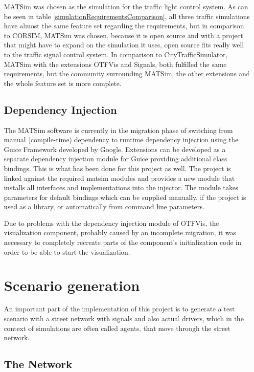 MATSim was chosen as the simulation for the traffic light control system. As can be seen in table \ref{simulationRequirementsComparison}, all three traffic simulations have almost the same feature set regarding the requirements, but in comparison to CORSIM, MATSim was chosen, because it is open source and with a project that might have to expand on the simulation it uses, open source fits really well to the traffic signal control system. In comparison to CityTrafficSimulator, MATSim with the extensions OTFVis and Signals, both fulfilled the same requirements, but the community surrounding MATSim, the other extensions and the whole feature set is more complete.

\subsection*{Dependency Injection}

The MATSim software is currently in the migration phase of switching from manual (compile-time) dependency to runtime dependency injection using the Guice Framework developed by Google. Extensions can be developed as a separate dependency injection module for Guice providing additional class bindings. This is what has been done for this project as well. The project is linked against the required matsim modules and provides a new module that installs all interfaces and implementations into the injector. The module takes parameters for default bindings which can be supplied manually, if the project is used as a library, or automatically from command line parameters.

Due to problems with the dependency injection module of OTFVis, the visualization component, probably caused by an incomplete migration, it was necessary to completely recreate parts of the component's initialization code in order to be able to start the visualization.

\section{Scenario generation}
\label{scenario_generation}

An important part of the implementation of this project is to generate a test scenario with a street network with signals and also actual drivers, which in the context of simulations are often called agents, that move through the street network.

\subsection*{The Network}

